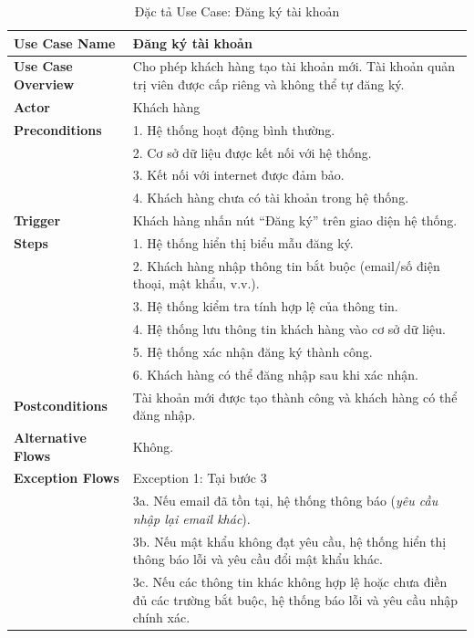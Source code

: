 {
\fontsize{12pt}{14pt}\selectfont
\renewcommand{\arraystretch}{1.0} 
\setlength{\extrarowheight}{4pt}

\begin{longtable}{|>{\bfseries}p{4cm}|p{11.5cm}|}
\caption{Đặc tả Use Case: Đăng ký tài khoản}
\label{tab:uc-register} \\
\hline
\textbf{Use Case Name} & Đăng ký tài khoản \\
\hline
\textbf{Use Case Overview} & Cho phép khách hàng tạo tài khoản mới. Tài khoản quản trị viên được cấp riêng và không thể tự đăng ký. \\
\hline
\textbf{Actor} & Khách hàng \\
\hline
\textbf{Preconditions} & 1. Hệ thống hoạt động bình thường. \\
& 2. Cơ sở dữ liệu được kết nối với hệ thống. \\
& 3. Kết nối với internet được đảm bảo. \\
& 4. Khách hàng chưa có tài khoản trong hệ thống. \\
\hline
\textbf{Trigger} & Khách hàng nhấn nút “Đăng ký” trên giao diện hệ thống. \\
\hline
\textbf{Steps} & 1. Hệ thống hiển thị biểu mẫu đăng ký. \\
& 2. Khách hàng nhập thông tin bắt buộc (email/số điện thoại, mật khẩu, v.v.). \\
& 3. Hệ thống kiểm tra tính hợp lệ của thông tin. \\
& 4. Hệ thống lưu thông tin khách hàng vào cơ sở dữ liệu. \\
& 5. Hệ thống xác nhận đăng ký thành công. \\
& 6. Khách hàng có thể đăng nhập sau khi xác nhận. \\
\hline
\textbf{Postconditions} & Tài khoản mới được tạo thành công và khách hàng có thể đăng nhập. \\
\hline
\textbf{Alternative Flows} & Không. \\
\hline
\textbf{Exception Flows} & Exception 1: Tại bước 3 \\
& 3a. Nếu email đã tồn tại, hệ thống thông báo (\textit{yêu cầu nhập lại email khác}). \\
& 3b. Nếu mật khẩu không đạt yêu cầu, hệ thống hiển thị thông báo lỗi và yêu cầu đổi mật khẩu khác. \\
& 3c. Nếu các thông tin khác không hợp lệ hoặc chưa điền đủ các trường bắt buộc, hệ thống báo lỗi và yêu cầu nhập chính xác. \\
\hline
\end{longtable}

}
